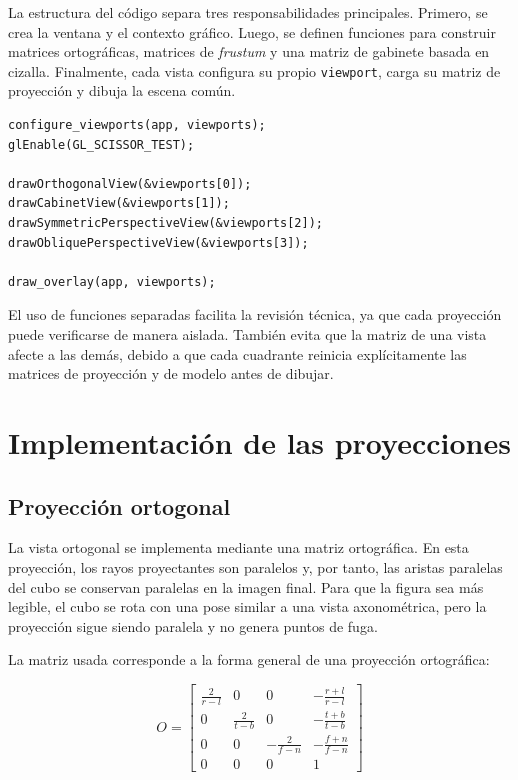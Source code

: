 \documentclass[12pt,a4paper]{article}
\begin{document}
La estructura del código separa tres responsabilidades principales. Primero, se crea la ventana y el contexto gráfico. Luego, se definen funciones para construir matrices ortográficas, matrices de \emph{frustum} y una matriz de gabinete basada en cizalla. Finalmente, cada vista configura su propio \texttt{viewport}, carga su matriz de proyección y dibuja la escena común.

\begin{lstlisting}[style=cstyle,caption={Renderizado independiente de las cuatro vistas.},label={lst:render}]
configure_viewports(app, viewports);
glEnable(GL_SCISSOR_TEST);

drawOrthogonalView(&viewports[0]);
drawCabinetView(&viewports[1]);
drawSymmetricPerspectiveView(&viewports[2]);
drawObliquePerspectiveView(&viewports[3]);

draw_overlay(app, viewports);
\end{lstlisting}

El uso de funciones separadas facilita la revisión técnica, ya que cada proyección puede verificarse de manera aislada. También evita que la matriz de una vista afecte a las demás, debido a que cada cuadrante reinicia explícitamente las matrices de proyección y de modelo antes de dibujar.

\section{Implementación de las proyecciones}

\subsection{Proyección ortogonal}

La vista ortogonal se implementa mediante una matriz ortográfica. En esta proyección, los rayos proyectantes son paralelos y, por tanto, las aristas paralelas del cubo se conservan paralelas en la imagen final. Para que la figura sea más legible, el cubo se rota con una pose similar a una vista axonométrica, pero la proyección sigue siendo paralela y no genera puntos de fuga.

La matriz usada corresponde a la forma general de una proyección ortográfica:

\[
O =
\begin{bmatrix}
\frac{2}{r-l} & 0 & 0 & -\frac{r+l}{r-l} \\
0 & \frac{2}{t-b} & 0 & -\frac{t+b}{t-b} \\
0 & 0 & -\frac{2}{f-n} & -\frac{f+n}{f-n} \\
0 & 0 & 0 & 1
\end{bmatrix}
\]
\end{document}
